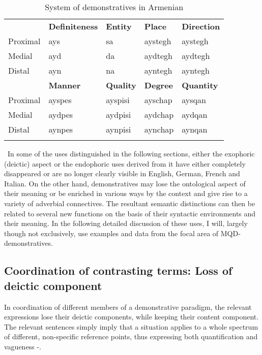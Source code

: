 \documentclass[output=paper,colorlinks,citecolor=brown]{langscibook}
\begin{document}
\begin{table}
\caption{System of demonstratives in Armenian}
\label{tab:koenig:1}

\begin{tabularx}{\textwidth}{XXXXX}
\lsptoprule
& {\bfseries Definiteness} & {\bfseries Entity} & {\bfseries Place} & {\bfseries Direction}\\
Proximal & ays & sa & aystegh & aystegh\\
Medial & ayd & da & aydtegh & aydtegh\\
Distal & ayn & na & ayntegh & ayntegh\\
& {\bfseries Manner} & {\bfseries Quality} & {\bfseries Degree} & {\bfseries Quantity}\\
Proximal & ayspes & ayspisi & ayschap & aysqan\\
Medial & aydpes & aydpisi & aydchap & aydqan\\
Distal & aynpes & aynpisi & aynchap & aynqan\\
\lspbottomrule
\end{tabularx}
\end{table}
\
In some of the uses distinguished in the following sections, either the exophoric (deictic) aspect or the endophoric uses derived from it have either completely disappeared or are no longer clearly visible in English, German, French and Italian. On the other hand, demonstratives may lose the ontological aspect of their meaning or be enriched in various ways by the context and give rise to a variety of adverbial connectives. The resultant semantic distinctions can then be related to several new functions on the basis of their syntactic environments and their meaning. In the following detailed discussion of these uses, I will, largely though not exclusively, use examples and data from the focal area of MQD-demonstratives.

\subsection{Coordination of contrasting terms: Loss of deictic component}

In coordination of different members of a demonstrative paradigm, the relevant expressions lose their deictic components, while keeping their content component. The relevant sentences simply imply that a situation applies to a whole spectrum of different, non-specific reference points, thus expressing both quantification and vagueness -.
\end{document}
